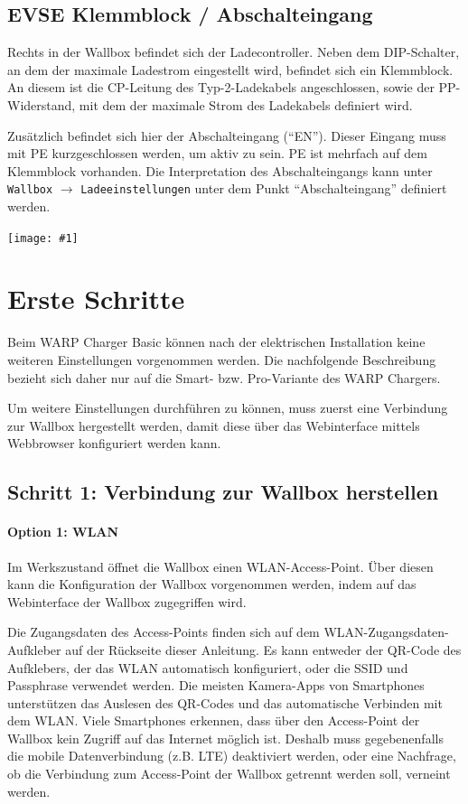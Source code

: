 \documentclass[a4paper,10pt]{article}
\newcommand{\gfx}[1]{\texttt{[image: \#1]}}
\begin{document}
\begin{multicols*}{2}
    \vspace{-0.1cm}
	\subsection{EVSE Klemmblock / Abschalteingang}\label{abschalteingang}
	Rechts in der Wallbox befindet sich der Ladecontroller. Neben dem DIP-Schalter,
	an dem der maximale Ladestrom eingestellt wird, befindet sich ein
	Klemmblock. An diesem ist die CP-Leitung des Typ-2-Ladekabels angeschlossen,
	sowie der PP-Widerstand, mit dem der maximale Strom des Ladekabels
	definiert wird.

	Zusätzlich befindet sich hier der Abschalteingang (\enquote{EN}).
	Dieser Eingang muss mit PE kurzgeschlossen werden, um aktiv zu sein. PE ist
	mehrfach auf dem Klemmblock vorhanden. Die Interpretation des Abschalteingangs kann unter \texttt{Wallbox} $\rightarrow$ \texttt{Ladeeinstellungen} unter dem Punkt \enquote{Abschalteingang} definiert werden.

    \gfx{./img_warp3/resized/evse_clamp.jpg}

    \newpage
    \section{Erste Schritte}\label{setup}

    Beim WARP Charger Basic können nach der elektrischen Installation
    keine weiteren Einstellungen vorgenommen werden. Die nachfolgende
    Beschreibung bezieht sich daher nur auf die Smart- bzw. Pro-Variante des WARP
    Chargers.

    Um weitere Einstellungen durchführen zu können, muss zuerst eine Verbindung
    zur Wallbox hergestellt werden, damit diese über das Webinterface mittels
	Webbrowser konfiguriert werden kann.

    \subsection{Schritt 1: Verbindung zur Wallbox herstellen}

    \paragraph{Option 1: WLAN}
    Im Werkszustand öffnet die Wallbox einen WLAN-Access-Point. Über diesen kann
    die Konfiguration der Wallbox vorgenommen werden, indem auf das
    Webinterface der Wallbox zugegriffen wird.

    Die Zugangsdaten des Access-Points finden sich auf dem WLAN-Zugangsdaten-Aufkleber
    auf der Rückseite dieser Anleitung. Es kann entweder der QR-Code des Aufklebers,
    der das WLAN automatisch konfiguriert, oder die SSID und Passphrase verwendet werden.
    Die meisten Kamera-Apps von Smartphones unterstützen das Auslesen des
    QR-Codes und das automatische Verbinden mit dem WLAN. Viele Smartphones
    erkennen, dass über den Access-Point der Wallbox kein Zugriff auf das
    Internet möglich ist. Deshalb muss gegebenenfalls die mobile Datenverbindung (z.B. LTE) deaktiviert werden, oder eine Nachfrage, ob die Verbindung zum Access-Point der Wallbox getrennt werden soll, verneint werden.


\end{multicols*}
\end{document}
